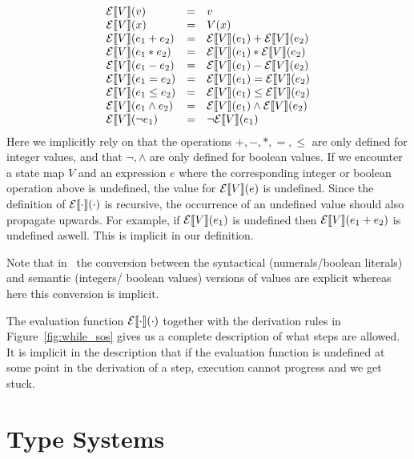 \begin{equation} \label{eq:exprevalfundef}
  \begin{array}{lll}
    \mathcal{E}\llbracket V \rrbracket(v) &=& v \\
    \mathcal{E}\llbracket V \rrbracket(x) &=& V(x) \\
    \mathcal{E}\llbracket V \rrbracket(e_1 + e_2) &=& \mathcal{E}\llbracket V \rrbracket(e_1) + \mathcal{E}\llbracket V \rrbracket(e_2) \\
    \mathcal{E}\llbracket V \rrbracket(e_1 * e_2) &=& \mathcal{E}\llbracket V \rrbracket(e_1) * \mathcal{E}\llbracket V \rrbracket(e_2) \\
    \mathcal{E}\llbracket V \rrbracket(e_1 - e_2) &=& \mathcal{E}\llbracket V \rrbracket(e_1) - \mathcal{E}\llbracket V \rrbracket(e_2) \\
    \mathcal{E}\llbracket V \rrbracket(e_1 = e_2) &=& \mathcal{E}\llbracket V \rrbracket(e_1) = \mathcal{E}\llbracket V \rrbracket(e_2) \\
    \mathcal{E}\llbracket V \rrbracket(e_1 \leq e_2) &=& \mathcal{E}\llbracket V \rrbracket(e_1) \leq \mathcal{E}\llbracket V \rrbracket(e_2) \\
    \mathcal{E}\llbracket V \rrbracket(e_1 \land e_2) &=& \mathcal{E}\llbracket V \rrbracket(e_1) \land \mathcal{E}\llbracket V \rrbracket(e_2) \\
    \mathcal{E}\llbracket V \rrbracket(\lnot e_1) &=& \lnot \mathcal{E}\llbracket V \rrbracket(e_1) \\
  \end{array}
\end{equation}
Here we implicitly rely on that the operations $+, -, *, =, \leq$ are only
defined for integer values, and that $\lnot, \land$ are only defined for boolean
values.  If we encounter a state map $V$ and an expression $e$ where the
corresponding integer or boolean operation above is undefined, the value for
$\mathcal{E}\llbracket V \rrbracket(e)$ is undefined. Since the definition of $\mathcal{E}\llbracket \cdot \rrbracket(\cdot)$ is
recursive, the occurrence of an undefined value should also propagate upwards.
For example, if $\mathcal{E}\llbracket V \rrbracket(e_1)$ is undefined then $\mathcal{E}\llbracket V \rrbracket(e_1 + e_2)$ is undefined
aswell. This is implicit in our definition.

\begin{remark}
  Note that in~\parencite{nielson2007semantics} the conversion between the
  syntactical (numerals\slash boolean literals) and semantic (integers\slash
  boolean values) versions of values are explicit whereas here this conversion
  is implicit.
\end{remark}

The evaluation function $\mathcal{E}\llbracket \cdot \rrbracket(\cdot)$ together with the derivation
rules in Figure~\ref{fig:while_sos} gives us a complete description of what
steps are allowed. It is implicit in the description that if the evaluation
function is undefined at some point in the derivation of a step, execution
cannot progress and we get stuck.

\section{Type Systems} \label{sec:type_systems}

